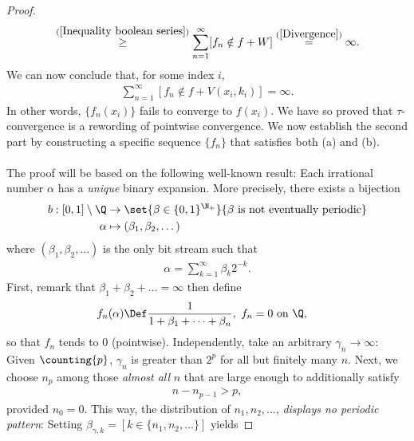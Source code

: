 \begin{proof}
\begin{align}
      \overset{(\ref{Inequality boolean series})}{\geq}
  \sum_{n=1}^\infty [f_n \notin f + W]
    \overset{(\ref{Divergence})}{=}
  \infty .
\end{align}
%
We can now conclude that, for some index $i$, 
%
\begin{align}
  \sum_{n=1}^\infty [f_n \notin f + V(x_i, k_i)] = \infty .
\end{align}
%
In other words, $\{f_n(x_i)\}$ fails to converge to $f(x_i)$. We have so %
proved that $\tau$-convergence is a rewording of pointwise convergence. %
%
We now establish the second part by constructing a specific sequence %
$\{f_n\}$ that satisfies both (a) and (b). \\
\\
The proof will be based on the following well-known result: %
Each irrational number $\alpha$ has a \textit{unique} binary expansion. %
More precisely, there exists a bijection %
%
\begin{align}
  b: [0, 1] \setminus \Q &\to \set{\beta \in \{0, 1\}^{\N_+}}{\beta \text{ is not eventually periodic}}\\
    \alpha &\mapsto (\beta_1, \beta_2, \dots)\nonumber
\end{align}
where $(\beta_1, \beta_2, \dots)$ is the only bit stream such that %
%
\begin{align}
  \label{definition of alpha}
  \alpha = \sum_{k=1}^\infty \beta_k 2^{\minus k}.
\end{align}
%
First, remark that $\beta_1 + \beta_2 + \dots = \infty$ then define %
%
\begin{align}
  \label{definition of f_n(alpha)}
  f_n(\alpha)  &\Def  \frac{1}{1 + \beta_1 + \dots + \beta_n}, \,\, f_n  = 0 \text{ on } \Q, 
\end{align}
%
so that $f_n$ tends to $0$ (pointwise). %
%
Independently, take an arbitrary %
%
$\gamma_n \longrightarrow \infty$: %
%
Given $\counting{p}$, $\gamma_n$ is greater than $2^p$ %
for all but finitely many $n$. %
%
Next, we choose $n_p$ among those \textit{almost all} $n$ that are 
large enough to additionally satisfy %
%
\begin{align}
  \label{definition of n_p}
  n - n_{p-1} > p, 
\end{align}
%
provided $n_0=0$. This way, the distribution of %
%
  $n_1, n_2, \dots$, %
%
\textit{displays no periodic pattern}: %
Setting $\beta_{\gamma, k} = [k \in \{n_1, n_2, \dots \}]$ yields %

\end{proof}
